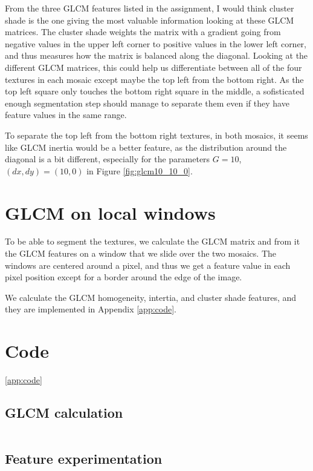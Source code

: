 \documentclass[a4paper]{article}
\begin{document}
From the three GLCM features listed in the assignment, I would think
cluster shade is the one giving the most valuable information looking at
these GLCM matrices. The cluster shade weights the matrix with a
gradient going from negative values in the upper left corner to positive
values in the lower left corner, and thus measures how the matrix is
balanced along the diagonal. Looking at the different GLCM matrices,
this could help us differentiate between all of the four textures in
each mosaic except maybe the top left from the bottom right. As the top
left square only touches the bottom right square in the middle, a
sofisticated enough segmentation step should manage to separate them
even if they have feature values in the same range.

To separate the top left from the bottom right textures, in both
mosaics, it seems like GLCM inertia would be a better feature, as the
distribution around the diagonal is a bit different, especially for the
parameters $G = 10$, $(dx, dy) = (10, 0)$ in Figure
\ref{fig:glcm10_10_0}.

\section{GLCM on local windows}

To be able to segment the textures, we calculate the GLCM matrix and
from it the GLCM features on a window that we slide over the two
mosaics. The windows are centered around a pixel, and thus we get a
feature value in each pixel position except for a border around the edge
of the image. 

We calculate the GLCM homogeneity, intertia, and cluster shade features,
and they are implemented in Appendix \ref{app:code}.

\appendix

\section{Code}
\ref{app:code}

\subsection{GLCM calculation}
\inputminted{python}{../glcm.py}

\subsection{Feature experimentation}
\end{document}
